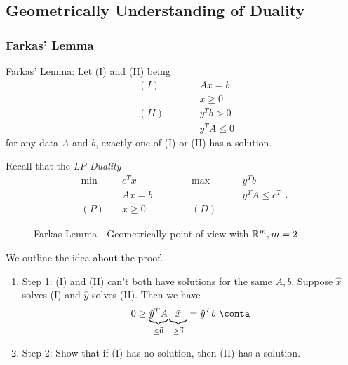 \subsection{Geometrically Understanding of Duality}
\subsubsection{Farkas' Lemma}
\begin{lemma}
	\label{Farkas Lemma}
	Farkas' Lemma: Let (I) and (II) being
	\[
		\begin{alignedat}{3}
			& (I) \qquad&& Ax = b       \\
			&      && x\geq 0      \\
			& (II) \qquad&& y^{T}b > 0 \\
			&      && y^{T}A\leq 0
		\end{alignedat}
	\]
	for any data \(A\) and \(b\), exactly one of (I) or (II) has a solution.
\end{lemma}
\begin{note}
	Recall that the \emph{LP Duality}
	\[
		\begin{alignedat}{5}
			\min~&c^{T}x\qquad\qquad&&\max ~&&y^{T}b\\
			&Ax = b 				&&		&&y^{T}A\leq c^{T}\\
			(P)\quad	&x\geq  0 	&&(D)\quad&&
		\end{alignedat}.
	\]
\end{note}

\begin{figure}[H]
	\centering
	\caption{Farkas Lemma - Geometrically point of view with \(\mathbb{\MakeUppercase{R}}^m, m = 2\) }
	\label{fig:Farkas-lemma}
\end{figure}

\begin{intuition}
	We outline the idea about the proof.
	\begin{enumerate}
		\item Step 1: (I) and (II) can't both have solutions for the same \(A, b\).
		      Suppose \(\hat{x}\) solves (I) and \(\hat{y}\) solves (II). Then we have
		      \[
			      0\geq  \underbrace{\hat{y}^{T} A}_{\leq \vec{0}} \underbrace{\vphantom{\hat{y}^{T}A} \hat{x}}_{\geq \vec{0}} = \hat{y}^{T} b\ \conta
		      \]
		\item Step 2: Show that if (I) has no solution, then (II) has a solution.
	\end{enumerate}
\end{intuition}
